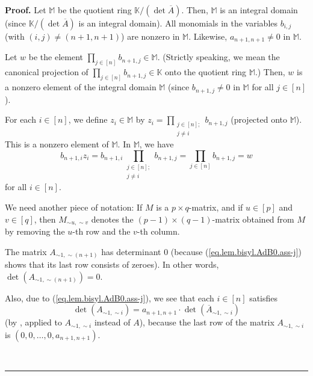 \documentclass[numbers=enddot,12pt,final,onecolumn,notitlepage]{scrartcl}%
\theoremstyle{definition}
\newenvironment{proof}[1][Proof]{\noindent\textbf{#1.} }{\ \rule{0.5em}{0.5em}}
\let\prodnonlimits\prod
\renewcommand{\prod}{\prodnonlimits\limits}
\begin{document}
\begin{proof}
Let $\mathbb{M}$ be the quotient ring $\mathbb{K}/\left(  \det\overline
{A}\right)  $. Then, $\mathbb{M}$ is an integral domain (since $\mathbb{K}%
/\left(  \det\overline{A}\right)  $ is an integral domain). All monomials in
the variables $b_{i,j}$ (with $\left(  i,j\right)  \neq\left(  n+1,n+1\right)
$) are nonzero in $\mathbb{M}$. Likewise, $a_{n+1,n+1}\neq0$ in $\mathbb{M}$.

Let $w$ be the element $\prod_{j\in\left[  n\right]  }b_{n+1,j}\in\mathbb{M}$.
(Strictly speaking, we mean the canonical projection of $\prod_{j\in\left[
n\right]  }b_{n+1,j}\in\mathbb{K}$ onto the quotient ring $\mathbb{M}$.) Then,
$w$ is a nonzero element of the integral domain $\mathbb{M}$ (since
$b_{n+1,j}\neq0$ in $\mathbb{M}$ for all $j\in\left[  n\right]  $).

For each $i\in\left[  n\right]  $, we define $z_{i}\in\mathbb{M}$ by
$z_{i}=\prod_{\substack{j\in\left[  n\right]  ;\\j\neq i}}b_{n+1,j}$
(projected onto $\mathbb{M}$). This is a nonzero element of $\mathbb{M}$. In
$\mathbb{M}$, we have%
\begin{equation}
b_{n+1,i}z_{i}=b_{n+1,i}\prod_{\substack{j\in\left[  n\right]  ;\\j\neq
i}}b_{n+1,j}=\prod_{j\in\left[  n\right]  }b_{n+1,j}=w
\label{pf.lem.bisyl.AdB0.bnizi}%
\end{equation}
for all $i\in\left[  n\right]  $.

We need another piece of notation: If $M$ is a $p\times q$-matrix, and if
$u\in\left[  p\right]  $ and $v\in\left[  q\right]  $, then $M_{\sim u,\sim
v}$ denotes the $\left(  p-1\right)  \times\left(  q-1\right)  $-matrix
obtained from $M$ by removing the $u$-th row and the $v$-th column.

The matrix $A_{\sim1,\sim\left(  n+1\right)  }$ has determinant $0$ (because
(\ref{eq.lem.bisyl.AdB0.ass-j}) shows that its last row consists of zeroes).
In other words, $\det\left(  A_{\sim1,\sim\left(  n+1\right)  }\right)  =0$.

Also, due to (\ref{eq.lem.bisyl.AdB0.ass-j}), we see that each $i\in\left[
n\right]  $ satisfies
\begin{equation}
\det\left(  A_{\sim1,\sim i}\right)  =a_{n+1,n+1}\cdot\det\left(  \overline
{A}_{\sim1,\sim i}\right)  \label{pf.lem.bisyl.AdB0.detA1i}%
\end{equation}
(by \cite[Theorem 6.43]{detnotes}, applied to $A_{\sim1,\sim i}$ instead of
$A$), because the last row of the matrix $A_{\sim1,\sim i}$ is $\left(
0,0,\ldots,0,a_{n+1,n+1}\right)  $.


\end{proof}
\end{document}
